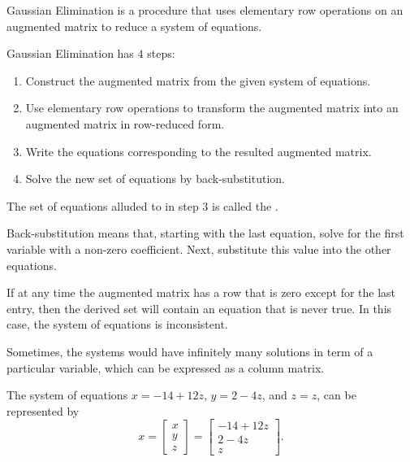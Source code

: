 \begin{definition}
  Gaussian Elimination is a procedure that uses elementary row operations on an augmented matrix to reduce
  a system of equations.

  Gaussian Elimination has $4$ steps:
  \begin{enumerate}
    \item Construct the augmented matrix from the given system of equations.
    \item Use elementary row operations to transform the augmented matrix into an augmented matrix in row-reduced form.
    \item Write the equations corresponding to the resulted augmented matrix.
    \item Solve the new set of equations by back-substitution.
  \end{enumerate}
\end{definition}

\begin{definition}
  The set of equations alluded to in step $3$ is called the .
\end{definition}

Back-substitution means that, starting with the last equation, solve for the first variable with a non-zero coefficient.
Next, substitute this value into the other equations.

\begin{remark}
  If at any time the augmented matrix has a row that is zero except for the last entry, then the derived set will
  contain an equation that is never true. In this case, the system of equations is inconsistent.
\end{remark}

Sometimes, the systems would have infinitely many solutions in term of a particular variable, which can be
expressed as a column matrix. 
\begin{example}
  The system of equations $x = -14 + 12z$, $y = 2 - 4z$, and $z = z$, can be represented by
  \begin{equation*}
    x = \begin{bmatrix} x \\ y \\ z \end{bmatrix} = \begin{bmatrix} -14 + 12z \\ 2 - 4z \\ z \end{bmatrix}.
  \end{equation*}
\end{example}

